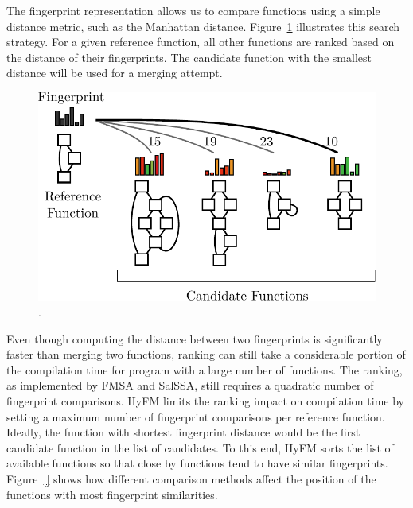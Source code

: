 The fingerprint representation allows us to compare functions using a simple distance metric, such as the Manhattan distance.
Figure~\ref{fig:hyfm-ranking} illustrates this search strategy.
For a given reference function, all other functions are ranked based on the distance of their fingerprints.
The candidate function with the smallest distance will be used for a merging attempt.


\begin{figure}[h]
  \centering
  \includegraphics[scale=0.8]{src/fastfm/figs/hyfm-ranking.pdf}
  \caption{.}
  \label{fig:hyfm-ranking}
\end{figure}

Even though computing the distance between two fingerprints is significantly faster than merging two functions, ranking can still take a considerable portion of the compilation time for program with a large number of functions.
The ranking, as implemented by FMSA and SalSSA, still requires a quadratic number of fingerprint comparisons.
HyFM limits the ranking impact on compilation time by setting a maximum number of fingerprint comparisons per reference function.
Ideally, the function with shortest fingerprint distance would be the first candidate function in the list of candidates.
To this end, HyFM sorts the list of available functions so that close by functions tend to have similar fingerprints.
Figure~\ref{} shows how different comparison methods affect the position of the functions with most fingerprint similarities.

